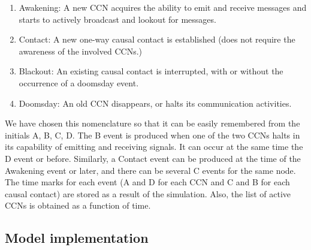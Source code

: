\documentclass[crop]{CSLB}
\newcommand{\ceti}{CCN}
\newcommand{\cetis}{CCNs}
\newcommand{\blackout}{B event }
\newcommand{\doomsday}{D event }
\newcommand{\aawakening}{Awakening event }
\newcommand{\ccontact}{Contact event }
\newcommand{\contacts}{C events }
\begin{document}
\begin{enumerate}
   \item[(A)] Awakening: A new \ceti{} acquires the ability to emit
      and receive messages and starts to actively broadcast and
      lookout for messages.
   \item[(C)] Contact: A new one-way causal contact is established
      (does not require the awareness of the involved \cetis{}.)
   \item[(B)] Blackout: An existing causal contact is interrupted,
      with or without the occurrence of a doomsday event.
   \item[(D)] Doomsday: An old \ceti{} disappears, or halts its
      communication activities.
\end{enumerate}

We have chosen this nomenclature so that it can be easily remembered
from the initials A, B, C, D.
%
The \blackout is produced when one of the two \cetis{} halts in its
capability of emitting and receiving signals.
%
It can occur at the same time the \doomsday or before.
%
Similarly, a \ccontact can be produced at the time of the \aawakening
or later, and there can be several \contacts for the same node.
%
The time marks for each event (A and D for each \ceti{} and C and B
for each causal contact) are stored as a result of the simulation.
%
Also, the list of active \cetis{} is obtained as a function of time.
%



%


\subsection{Model implementation}
\end{document}
